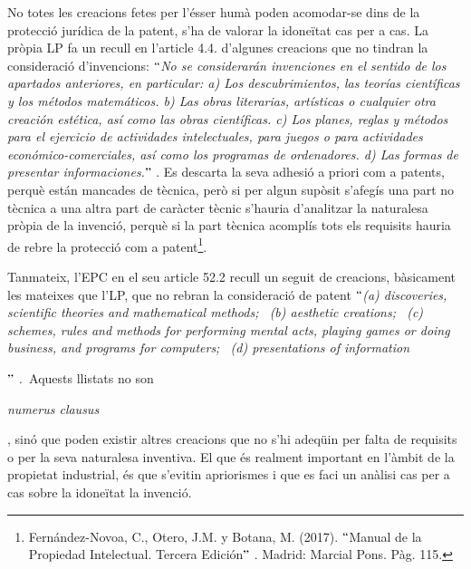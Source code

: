 \documentclass[12pt]{article}
\begin{document}
\vspace{\baselineskip}
\begin{justify}
No totes les creacions fetes per l’ésser humà poden acomodar-se dins de la protecció jurídica de la patent, s’ha de valorar la idoneïtat cas per a cas. La pròpia LP fa un recull en l’article 4.4. d’algunes creacions que no tindran la consideració d’invencions: \textit{$``$No se considerarán invenciones en el sentido de los apartados anteriores, en particular: a) Los descubrimientos, las teorías científicas y los métodos matemáticos. b) Las obras literarias, artísticas o cualquier otra creación estética, así como las obras científicas. c) Los planes, reglas y métodos para el ejercicio de actividades intelectuales, para juegos o para actividades económico-comerciales, así como los programas de ordenadores. d) Las formas de presentar informaciones.$"$ }. Es descarta la seva adhesió a priori com a patents, perquè están mancades de tècnica, però si per algun supòsit s’afegís una part no tècnica a una altra part de caràcter tècnic s’hauria d’analitzar la naturalesa pròpia de la invenció, perquè si la part tècnica acomplís tots els requisits hauria de rebre la protecció com a patent\footnote{ Fernández-Novoa, C., Otero, J.M. y Botana, M. (2017). $``$Manual de la Propiedad Intelectual. Tercera Edición$"$ . Madrid: Marcial Pons. Pàg. 115. }. 
\end{justify}\par


\vspace{\baselineskip}
\begin{justify}
Tanmateix, l’EPC en el seu article 52.2 recull un seguit de creacions, bàsicament les mateixes que l’LP, que no rebran la consideració de patent \textit{$``$(a) discoveries, scientific theories and mathematical methods;  (b) aesthetic creations;  (c) schemes, rules and methods for performing mental acts, playing games or doing business, and programs for computers;  (d) presentations of information}{\fontsize{11pt}{13.2pt}\selectfont \textit{$"$ . }Aquests llistats no son \par}\textit{numerus clausus}{\fontsize{11pt}{13.2pt}\selectfont , sinó que poden existir altres creacions que no s’hi adeqüin per falta de requisits o per la seva naturalesa inventiva. El que és realment important en l’àmbit de la propietat industrial, és que s’evitin apriorismes i que es faci un anàlisi cas per a cas sobre la idoneïtat la invenció. \par}
\end{justify}\par
\end{document}
